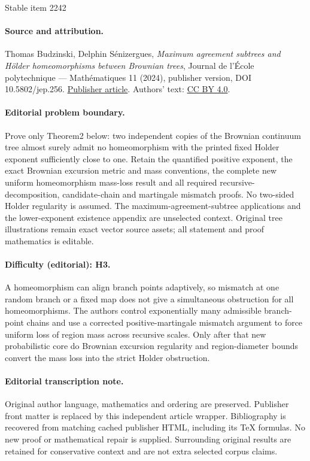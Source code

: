 \documentclass[11pt]{article}
\theoremstyle{plain}
\theoremstyle{definition}
\numberwithin{equation}{section}
\begin{document}
\begin{center}{\Large Stable item 2242}\end{center}
\paragraph{Source and attribution.}
Thomas Budzinski, Delphin Sénizergues, \emph{Maximum agreement subtrees and Hölder homeomorphisms between Brownian trees}, Journal de l’École polytechnique — Mathématiques 11 (2024), publisher version, DOI 10.5802/jep.256. \href{https://jep.centre-mersenne.org/articles/10.5802/jep.256/}{Publisher article}. Authors' text: \href{https://creativecommons.org/licenses/by/4.0/}{CC BY 4.0}.
\paragraph{Editorial problem boundary.}
Prove only Theorem2 below: two independent copies of the Brownian continuum tree almost surely admit no homeomorphism with the printed fixed Holder exponent sufficiently close to one. Retain the quantified positive exponent, the exact Brownian excursion metric and mass conventions, the complete new uniform homeomorphism mass-loss result and all required recursive-decomposition, candidate-chain and martingale mismatch proofs. No two-sided Holder regularity is assumed. The maximum-agreement-subtree applications and the lower-exponent existence appendix are unselected context. Original tree illustrations remain exact vector source assets; all statement and proof mathematics is editable.
\paragraph{Difficulty (editorial): H3.}
A homeomorphism can align branch points adaptively, so mismatch at one random branch or a fixed map does not give a simultaneous obstruction for all homeomorphisms. The authors control exponentially many admissible branch-point chains and use a corrected positive-martingale mismatch argument to force uniform loss of region mass across recursive scales. Only after that new probabilistic core do Brownian excursion regularity and region-diameter bounds convert the mass loss into the strict Holder obstruction.
\paragraph{Editorial transcription note.}
Original author language, mathematics and ordering are preserved. Publisher front matter is replaced by this independent article wrapper. Bibliography is recovered from matching cached publisher HTML, including its TeX formulas. No new proof or mathematical repair is supplied. Surrounding original results are retained for conservative context and are not extra selected corpus claims.
\clearpage
\end{document}
